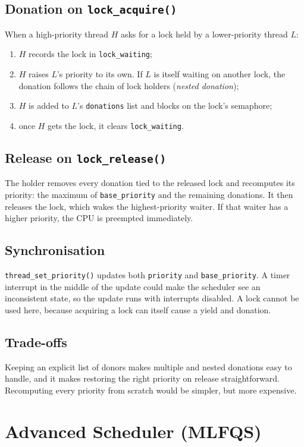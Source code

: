 \documentclass[a4paper,11pt]{article}
\newcommand{\code}[1]{\texttt{#1}}
\begin{document}
\subsection*{Donation on \code{lock\_acquire()}}
When a high-priority thread $H$ asks for a lock held by a lower-priority thread $L$:
\begin{enumerate}
  \item $H$ records the lock in \code{lock\_waiting};
  \item $H$ raises $L$'s priority to its own. If $L$ is itself waiting on another lock, the donation follows the chain of lock holders (\emph{nested donation});
  \item $H$ is added to $L$'s \code{donations} list and blocks on the lock's semaphore;
  \item once $H$ gets the lock, it clears \code{lock\_waiting}.
\end{enumerate}

\subsection*{Release on \code{lock\_release()}}
The holder removes every donation tied to the released lock and recomputes its priority: the maximum of \code{base\_priority} and the remaining donations. It then releases the lock, which wakes the highest-priority waiter. If that waiter has a higher priority, the CPU is preempted immediately.

\subsection*{Synchronisation}
\code{thread\_set\_priority()} updates both \code{priority} and \code{base\_priority}. A timer interrupt in the middle of the update could make the scheduler see an inconsistent state, so the update runs with interrupts disabled. A lock cannot be used here, because acquiring a lock can itself cause a yield and donation.

\subsection*{Trade-offs}
Keeping an explicit list of donors makes multiple and nested donations easy to handle, and it makes restoring the right priority on release straightforward. Recomputing every priority from scratch would be simpler, but more expensive.

\section{Advanced Scheduler (MLFQS)}
\end{document}
